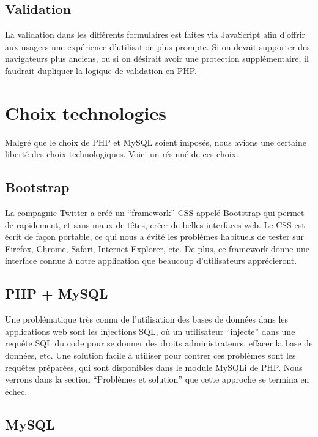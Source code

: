\documentclass[10pt]{article}
\begin{document}
\subsection{Validation}

La validation dans les différents formulaires est faites via
JavaScript afin d'offrir aux usagers une expérience d'utilisation plus
prompte. Si on devait supporter des navigateurs plus anciens, ou si on
désirait avoir une protection supplémentaire, il faudrait dupliquer la
logique de validation en PHP.


\section{Choix technologies}

Malgré que le choix de PHP et MySQL soient imposés, nous avions une
certaine liberté des choix technologiques. Voici un résumé de ces
choix.

\subsection{Bootstrap}

La compagnie Twitter a créé un ``framework'' CSS appelé Bootstrap qui
permet de rapidement, et sans maux de têtes, créer de belles
interfaces web.  Le CSS est écrit de façon portable, ce qui nous a
évité les problèmes habituels de tester sur Firefox, Chrome, Safari,
Internet Explorer, etc.  De plus, ce framework donne une interface
connue à notre application que beaucoup d'utilisateurs apprécieront.

\subsection{PHP + MySQL}

Une problématique très connu de l'utilisation des bases de données
dans les applications web sont les injections SQL, où un utilisateur
``injecte'' dans une requête SQL du code pour se donner des droits
administrateurs, effacer la base de données, etc.  Une solution facile
à utiliser pour contrer ces problèmes sont les requêtes préparées, qui
sont disponibles dans le module MySQLi de PHP.  Nous verrons dans la
section ``Problèmes et solution'' que cette approche se termina en
échec.

\subsection{MySQL}
\end{document}
